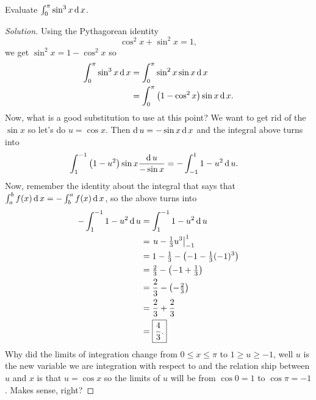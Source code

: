 \begin{problem}
Evaluate $\int_0^\pi\sin^3 x\operatorname{d} x$.
\end{problem}
\begin{proof}[Solution]
Using the Pythagorean identity
\begin{equation}
\label{eq:pythagorean-identity}
\cos^2 x+\sin^2 x=1,
\end{equation}
we get $\sin^2 x=1-\cos^2 x$ so
\begin{align*}
\int_0^\pi\sin^3x\operatorname{d} x
&=\int_0^\pi\sin^2x\sin x\operatorname{d} x\\
&=\int_0^\pi\left(1-\cos^2x\right)\sin x\operatorname{d} x.
\end{align*}
Now, what is a good substitution to use at this point? We want to get rid
of the $\sin x$ so let's do $u=\cos x$. Then $\operatorname{d} u=-\sin x\operatorname{d} x$ and
the integral above turns into
\begin{align*}
\int_1^{-1}\left(1-u^2\right)\sin x\frac{\operatorname{d} u}{-\sin x}
&=-\int_{-1}^11-u^2\operatorname{d} u.
\end{align*}
Now, remember the identity about the integral that says that
$\int_a^b f(x)\operatorname{d} x=-\int_b^a f(x)\operatorname{d} x$, so the above turns into
\begin{align*}
-\int_1^{-1}1-u^2\operatorname{d} u
&=\int_1^{-1}1-u^2\operatorname{d} u\\
&=\left.u-\tfrac{1}{3}u^3\right|_{-1}^1\\
&=1-\tfrac{1}{3}-\left(-1-\tfrac{1}{3}(-1)^3\right)\\
&=\tfrac{2}{3}-\left(-1+\tfrac{1}{3}\right)\\
&=\frac{2}{3}-\left(-\tfrac{2}{3}\right)\\
&=\frac{2}{3}+\frac{2}{3}\\
&=\boxed{\frac{4}{3}.}\qedhere
\end{align*}
Why did the limits of integration change from $0\leq x\leq\pi$ to $1\geq
u\geq -1$, well $u$ is the new variable we are integration with respect to
and the relation ship between $u$ and $x$ is that $u=\cos x$ so the limits
of $u$ will be from $\cos 0=1$ to $\cos\pi=-1$. Makes sense, right?
\end{proof}

